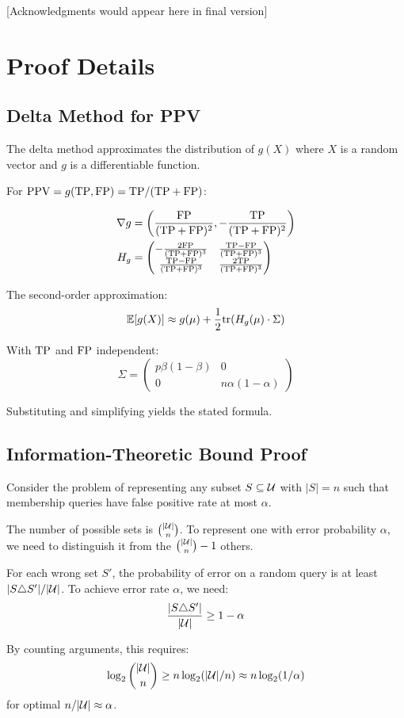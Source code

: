 \documentclass[11pt]{article}
\newcommand{\PPV}{\text{PPV}} %
\begin{document}
[Acknowledgments would appear here in final version]




\appendix

\section{Proof Details}

\subsection{Delta Method for PPV}

The delta method approximates the distribution of $g(X)$ where $X$ is a random vector and $g$ is a differentiable function.

For $\PPV = g(\TP, \FP) = \TP/(\TP + \FP)$:

\begin{align}
\nabla g &= \left(\frac{\text{FP}}{(\text{TP}+\text{FP})^2}, -\frac{\text{TP}}{(\text{TP}+\text{FP})^2}\right) \\
H_g &= \begin{pmatrix}
-\frac{2\text{FP}}{(\text{TP}+\text{FP})^3} & \frac{\text{TP}-\text{FP}}{(\text{TP}+\text{FP})^3} \\
\frac{\text{TP}-\text{FP}}{(\text{TP}+\text{FP})^3} & \frac{2\text{TP}}{(\text{TP}+\text{FP})^3}
\end{pmatrix}
\end{align}

The second-order approximation:
\[
\mathbb{E}[g(X)] \approx g(\mu) + \frac{1}{2}\text{tr}(H_g(\mu) \cdot \Sigma)
\]

With $\text{TP}$ and $\text{FP}$ independent:
\[
\Sigma = \begin{pmatrix}
p\beta(1-\beta) & 0 \\
0 & n\alpha(1-\alpha)
\end{pmatrix}
\]

Substituting and simplifying yields the stated formula.

\subsection{Information-Theoretic Bound Proof}

Consider the problem of representing any subset $S \subseteq \mathcal{U}$ with $|S| = n$ such that membership queries have false positive rate at most $\alpha$.

The number of possible sets is $\binom{|\mathcal{U}|}{n}$. To represent one with error probability $\alpha$, we need to distinguish it from the $\binom{|\mathcal{U}|}{n} - 1$ others.

For each wrong set $S'$, the probability of error on a random query is at least $|S \triangle S'|/|\mathcal{U}|$. To achieve error rate $\alpha$, we need:
\[
\frac{|S \triangle S'|}{|\mathcal{U}|} \geq 1 - \alpha
\]

By counting arguments, this requires:
\[
\log_2 \binom{|\mathcal{U}|}{n} \geq n\log_2(|\mathcal{U}|/n) \approx n\log_2(1/\alpha)
\]
for optimal $n/|\mathcal{U}| \approx \alpha$.
\end{document}
